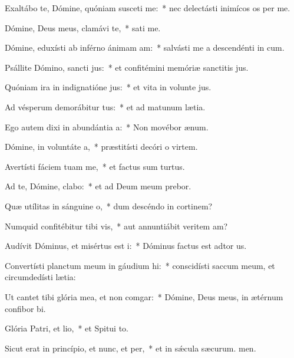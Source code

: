 \item Exaltábo te, Dómine, quóniam susceti me:~* nec delectásti inimícos os per me.
\item Dómine, Deus meus, clamávi  te,~*  sati me.
\item Dómine, eduxísti ab inférno ánimam am:~* salvásti me a descendénti in cum.
\item Psállite Dómino, sancti jus:~* et confitémini memóriæ sanctitis jus.
\item Quóniam ira in indignatióne jus:~* et vita in volunte jus.
\item Ad vésperum demorábitur tus:~* et ad matunum lætia.
\item Ego autem dixi in abundántia a:~* Non movébor  ænum.
\item Dómine, in voluntáte a,~* præstitísti decóri o virtem.
\item Avertísti fáciem tuam  me,~* et factus sum turtus.
\item Ad te, Dómine, clabo:~* et ad Deum meum prebor.
\item Quæ utílitas in sánguine o,~* dum descéndo in cortinem?
\item Numquid confitébitur tibi vis,~* aut annuntiábit veritem am?
\item Audívit Dóminus, et misértus est i:~* Dóminus factus est adtor us.
\item Convertísti planctum meum in gáudium hi:~* conscidísti saccum meum, et circumdedísti  lætia:
\item Ut cantet tibi glória mea, et non comgar:~* Dómine, Deus meus, in ætérnum confibor bi.
\item Glória Patri, et lio,~* et Spitui to.
\item Sicut erat in princípio, et nunc, et per,~* et in sǽcula sæcurum. men.
